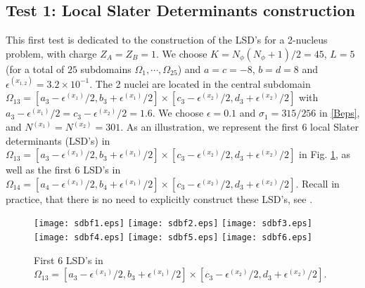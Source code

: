 \subsection{Test 1: Local Slater Determinants construction}\label{test1}
This first test is dedicated to the construction of the LSD's for a 2-nucleus problem, with charge $Z_A=Z_B=1$. We choose $K=N_{\phi}(N_{\phi}+1)/2=45$, $L=5$ (for a total of $25$ subdomains $\Omega_1, \cdots,\Omega_{25}$) and $a=c=-8$, $b=d=8$ and $\epsilon^{(x_{1,2})}=3.2\times 10^{-1}$. The 2 nuclei are located in the central subdomain $\Omega_{13}=[a_3-\epsilon^{(x_1)}/2,b_3+\epsilon^{(x_1)}/2]\times[c_3-\epsilon^{(x_2)}/2,d_3+\epsilon^{(x_2)}/2]$ with $a_3-\epsilon^{(x_1)}/2=c_3-\epsilon^{(x_2)}/2=1.6$. We choose $\epsilon=0.1$ and $\sigma_1=315/256$ in \eqref{Beps}, and $N^{(x_1)}=N^{(x_2)}=301$. As an illustration, we represent the first 6 local Slater determinants (LSD's) in $\Omega_{13}=[a_3-\epsilon^{(x_1)}/2,b_3+\epsilon^{(x_1)}/2]\times[c_3-\epsilon^{(x_2)}/2,d_3+\epsilon^{(x_2)}/2]$ in Fig. \ref{SDBF_3x3}, as well as the first 6 LSD's in $\Omega_{14}=[a_4-\epsilon^{(x_1)}/2,b_4+\epsilon^{(x_1)}/2]\times[c_3-\epsilon^{(x_2)}/2,d_3+\epsilon^{(x_2)}/2]$. Recall in practice, that there is no need to explicitly construct these LSD's, see \cite{CAM15-10}.
\begin{figure}[!ht]
\begin{center}
\hspace*{1mm}\texttt{[image: sdbf1.eps]}
\hspace*{1mm}\texttt{[image: sdbf2.eps]}
\hspace*{1mm}\texttt{[image: sdbf3.eps]}
\hspace*{1mm}\texttt{[image: sdbf4.eps]}
\hspace*{1mm}\texttt{[image: sdbf5.eps]}
\hspace*{1mm}\texttt{[image: sdbf6.eps]}
\caption{First $6$ LSD's in $\Omega_{13}=[a_3-\epsilon^{(x_1)}/2,b_3+\epsilon^{(x_1)}/2]\times[c_3-\epsilon^{(x_2)}/2,d_3+\epsilon^{(x_2)}/2]$.}
\label{SDBF_3x3}
\end{center}
\end{figure}
